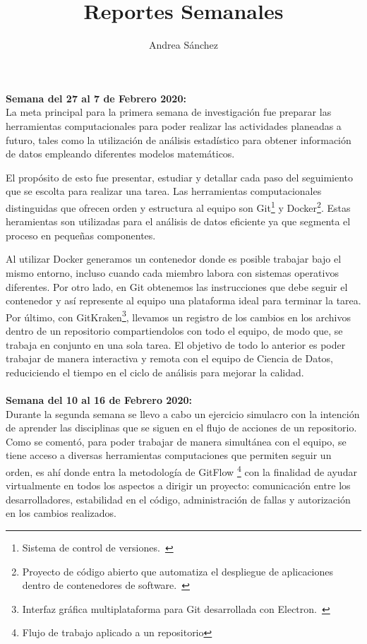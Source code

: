 \documentclass{article}
\title{Reportes Semanales}
\author{Andrea Sánchez}
\begin{document}
\maketitle
    \textbf{Semana del 27 al 7 de Febrero 2020:} \\
    La meta principal para la primera semana de investigación fue preparar las herramientas computacionales para poder realizar las actividades planeadas a futuro, tales como la utilización de análisis estadístico para obtener información de datos empleando diferentes modelos matemáticos.

    El propósito de esto fue presentar, estudiar y detallar cada paso del seguimiento que se escolta para realizar una tarea. Las herramientas computacionales distinguidas que ofrecen orden y estructura al equipo son Git\footnote{Sistema de control de versiones.~\cite{bergh2019}} y Docker\footnote{Proyecto de código abierto que automatiza el despliegue de aplicaciones dentro de contenedores de software.~\cite{bergh2019}}.
        Estas heramientas son utilizadas para el análisis de datos eficiente ya que segmenta el proceso en pequeñas componentes.

    Al utilizar Docker generamos un contenedor donde es posible trabajar bajo el mismo entorno, incluso cuando cada miembro labora con sistemas operativos diferentes. Por otro lado, en Git obtenemos las instrucciones que debe seguir el contenedor y así represente al equipo una plataforma ideal para terminar la tarea. Por último, con GitKraken\footnote{Interfaz gráfica multiplataforma para Git desarrollada con Electron.~\cite{bergh2019}}, llevamos un registro de los cambios en los archivos dentro de un repositorio compartiendolos con todo el equipo, de modo que, se trabaja en conjunto en una sola tarea.
    El objetivo de todo lo anterior es poder trabajar de manera interactiva y remota con el equipo de Ciencia de Datos, reduciciendo el tiempo en el ciclo de análisis para mejorar la calidad.
\\ \\ 
    \textbf{Semana del 10 al 16 de Febrero 2020:} \\
    Durante la segunda semana se llevo a cabo un ejercicio simulacro con la intención de aprender las disciplinas que se siguen en el flujo de acciones de un repositorio. Como se comentó, para poder trabajar de manera simultánea con el equipo, se tiene acceso a diversas herramientas computaciones que permiten seguir un orden, es ahí donde entra la metodología de GitFlow \footnote{Flujo de trabajo aplicado a un repositorio} con la finalidad de ayudar virtualmente en todos los aspectos a dirigir un proyecto: comunicación entre los desarrolladores, estabilidad en el código, administración de fallas y autorización en los cambios realizados.
\end{document}
